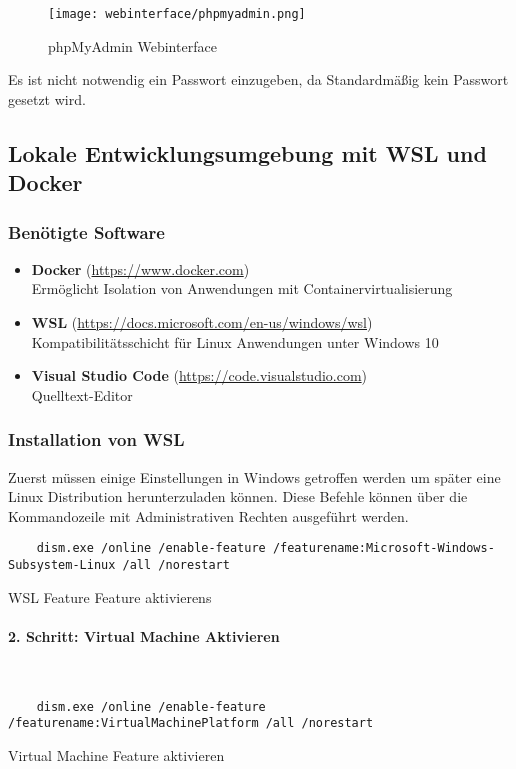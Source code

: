 \begin{figure}[H]
  \centering
  \texttt{[image: webinterface/phpmyadmin.png]}
  \caption{phpMyAdmin Webinterface}
\end{figure}

Es ist nicht notwendig ein Passwort einzugeben, da Standardmäßig kein Passwort
gesetzt wird.


\subsection{Lokale Entwicklungsumgebung mit WSL und Docker}


\subsubsection{Benötigte Software}

\begin{itemize}
  \item \textbf{Docker} (\url{https://www.docker.com}) \\ Ermöglicht Isolation
        von Anwendungen mit Containervirtualisierung
  \item \textbf{WSL} (\url{https://docs.microsoft.com/en-us/windows/wsl}) \\
        Kompatibilitätsschicht für Linux Anwendungen unter Windows 10
  \item \textbf{Visual Studio Code} (\url{https://code.visualstudio.com}) \\
        Quelltext-Editor
\end{itemize}


\subsubsection{Installation von WSL}
Zuerst müssen einige Einstellungen in Windows getroffen werden um später eine
Linux Distribution herunterzuladen können. Diese Befehle können über die
Kommandozeile mit Administrativen Rechten ausgeführt werden.

\begin{listing}[H]
  \begin{verbatim}
    dism.exe /online /enable-feature /featurename:Microsoft-Windows-Subsystem-Linux /all /norestart
  \end{verbatim}
  \caption{WSL Feature Feature aktivierens}
\end{listing}

\paragraph{2. Schritt: Virtual Machine Aktivieren}\mbox{}\\
\begin{listing}[H]
  \begin{verbatim}
    dism.exe /online /enable-feature /featurename:VirtualMachinePlatform /all /norestart
  \end{verbatim}
  \caption{Virtual Machine Feature aktivieren}
\end{listing}

